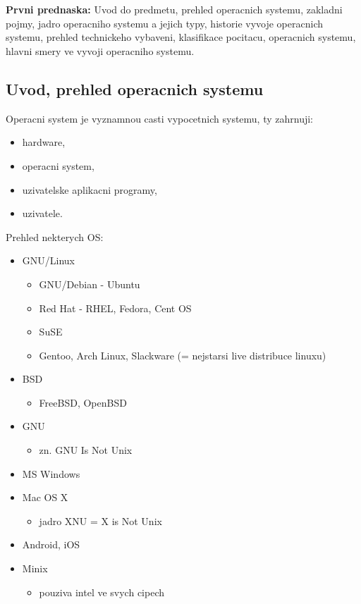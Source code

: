 \documentclass[a4paper, 11pt]{article}
\begin{document}
\newpage

\section{} \label{start-of-doc}
\textbf{Prvni prednaska:} Uvod do predmetu, prehled operacnich systemu, zakladni pojmy, jadro operacniho systemu a jejich typy, historie vyvoje operacnich systemu, prehled technickeho vybaveni, klasifikace pocitacu, operacnich systemu, hlavni smery ve vyvoji operacniho systemu. \\
\subsection{Uvod, prehled operacnich systemu}

Operacni system je vyznamnou casti vypocetnich systemu, ty zahrnuji:
\begin{itemize}
    \item hardware, 
    \item operacni system,
    \item uzivatelske aplikacni programy,
    \item uzivatele. \\
\end{itemize}

Prehled nekterych OS:
\begin{itemize}
    \item GNU/Linux 
    \begin{itemize}
        \item GNU/Debian - Ubuntu 
        \item Red Hat - RHEL, Fedora, Cent OS 
        \item SuSE 
        \item Gentoo, Arch Linux, Slackware (= nejstarsi live distribuce linuxu) 
    \end{itemize}
    \item BSD 
    \begin{itemize}
        \item FreeBSD, OpenBSD 
    \end{itemize}
    \item GNU
    \begin{itemize}
        \item zn. GNU Is Not Unix
    \end{itemize}
    \item MS Windows 
    \item Mac OS X
    \begin{itemize}
        \item jadro XNU = X is Not Unix
    \end{itemize}
    \item Android, iOS 
    \item Minix
    \begin{itemize}
        \item pouziva intel ve svych cipech \\
    \end{itemize}
\end{itemize}
\newpage
\end{document}
